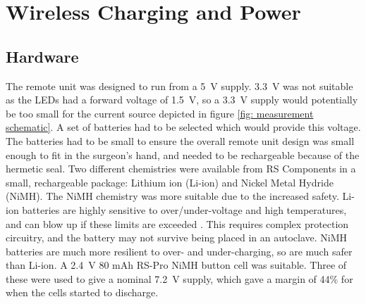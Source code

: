 \section{Wireless Charging and Power}\label{power}

\subsection{Hardware}

The remote unit was designed to run from a \SI{5}{\volt} supply. \SI{3.3}{\volt} was not suitable as the LEDs had a forward voltage of \SI{1.5}{\volt}, so a \SI{3.3}{\volt} supply would potentially be too small for the current source depicted in figure \ref{fig: measurement schematic}. A set of batteries had to be selected which would provide this voltage. The batteries had to be small to ensure the overall remote unit design was small enough to fit in the surgeon's hand, and needed to be rechargeable because of the hermetic seal. Two different chemistries were available from RS Components \cite{rs} in a small, rechargeable package: Lithium ion (Li-ion) and Nickel Metal Hydride (NiMH). The NiMH chemistry was more suitable due to the increased safety. Li-ion batteries are highly sensitive to over/under-voltage and high temperatures, and can blow up if these limits are exceeded \cite{batteries}. This requires complex protection circuitry, and the battery may not survive being placed in an autoclave. NiMH batteries are much more resilient to over- and under-charging, so are much safer than Li-ion. A \SI{2.4}{\volt} 80 mAh RS-Pro NiMH button cell \cite{rs_pro_batteries} was suitable. Three of these were used to give a nominal \SI{7.2}{\volt} supply, which gave a margin of 44\% for when the cells started to discharge.\\

